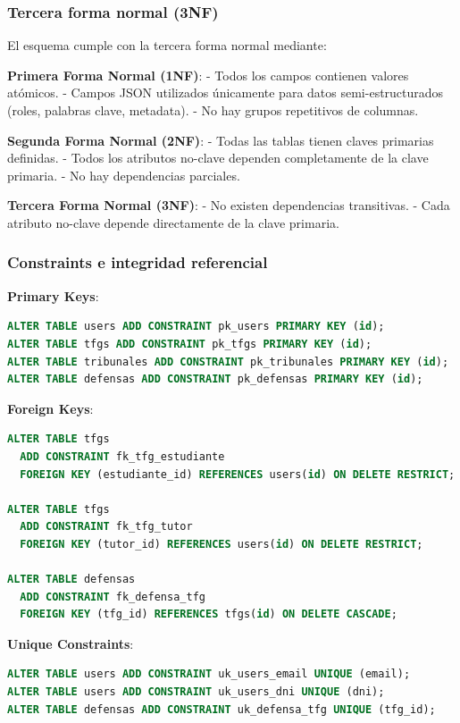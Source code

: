 \documentclass[12pt,a4paper,oneside]{report}
\begin{document}
\subsubsection{Tercera forma normal
(3NF)}\label{tercera-forma-normal-3nf}

El esquema cumple con la tercera forma normal mediante:

\textbf{Primera Forma Normal (1NF)}: - Todos los campos contienen
valores atómicos. - Campos JSON utilizados únicamente para datos
semi-estructurados (roles, palabras clave, metadata). - No hay grupos
repetitivos de columnas.

\textbf{Segunda Forma Normal (2NF)}: - Todas las tablas tienen claves
primarias definidas. - Todos los atributos no-clave dependen
completamente de la clave primaria. - No hay dependencias parciales.

\textbf{Tercera Forma Normal (3NF)}: - No existen dependencias
transitivas. - Cada atributo no-clave depende directamente de la clave
primaria.

\subsubsection{Constraints e integridad
referencial}\label{constraints-e-integridad-referencial}

\textbf{Primary Keys}:

\begin{lstlisting}[language=SQL]
ALTER TABLE users ADD CONSTRAINT pk_users PRIMARY KEY (id);
ALTER TABLE tfgs ADD CONSTRAINT pk_tfgs PRIMARY KEY (id);
ALTER TABLE tribunales ADD CONSTRAINT pk_tribunales PRIMARY KEY (id);
ALTER TABLE defensas ADD CONSTRAINT pk_defensas PRIMARY KEY (id);
\end{lstlisting}

\textbf{Foreign Keys}:

\begin{lstlisting}[language=SQL]
ALTER TABLE tfgs 
  ADD CONSTRAINT fk_tfg_estudiante 
  FOREIGN KEY (estudiante_id) REFERENCES users(id) ON DELETE RESTRICT;

ALTER TABLE tfgs 
  ADD CONSTRAINT fk_tfg_tutor 
  FOREIGN KEY (tutor_id) REFERENCES users(id) ON DELETE RESTRICT;

ALTER TABLE defensas 
  ADD CONSTRAINT fk_defensa_tfg 
  FOREIGN KEY (tfg_id) REFERENCES tfgs(id) ON DELETE CASCADE;
\end{lstlisting}

\textbf{Unique Constraints}:

\begin{lstlisting}[language=SQL]
ALTER TABLE users ADD CONSTRAINT uk_users_email UNIQUE (email);
ALTER TABLE users ADD CONSTRAINT uk_users_dni UNIQUE (dni);
ALTER TABLE defensas ADD CONSTRAINT uk_defensa_tfg UNIQUE (tfg_id);
\end{lstlisting}
\end{document}
